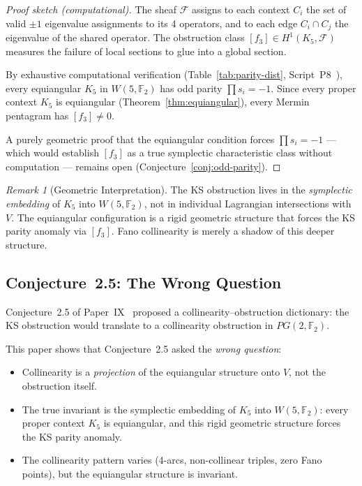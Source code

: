 \documentclass[11pt,a4paper]{article}
\theoremstyle{remark}
\newtheorem{remark}[theorem]{Remark}
\newcommand{\F}{\mathbb{F}}
\newcommand{\cF}{\mathcal{F}}
\begin{document}
\begin{proof}[Proof sketch (computational)]
The sheaf $\cF$ assigns to each context $C_i$ the set of valid
$\pm 1$ eigenvalue assignments to its 4 operators, and to each edge
$C_i \cap C_j$ the eigenvalue of the shared operator. The obstruction
class $[f_3] \in H^1(K_5, \cF)$ measures the failure of local sections
to glue into a global section.

By exhaustive computational verification
(Table~\ref{tab:parity-dist}, Script~P8~\cite{PaperXsuppl}), every equiangular $K_5$
in $W(5, \F_2)$ has odd parity $\prod s_i = -1$. Since every proper
context $K_5$ is equiangular (Theorem~\ref{thm:equiangular}), every
Mermin pentagram has $[f_3] \neq 0$.

A purely geometric proof that the equiangular condition forces
$\prod s_i = -1$ --- which would establish $[f_3]$ as a true
symplectic characteristic class without computation --- remains open
(Conjecture~\ref{conj:odd-parity}).
\end{proof}

\begin{remark}[Geometric Interpretation]
The KS obstruction lives in the \emph{symplectic embedding} of $K_5$
into $W(5, \F_2)$, not in individual Lagrangian intersections with $V$.
The equiangular configuration is a rigid geometric structure that forces
the KS parity anomaly via $[f_3]$. Fano collinearity is merely a shadow
of this deeper structure.
\end{remark}

\subsection{Conjecture~2.5: The Wrong Question}

Conjecture~2.5 of Paper~IX~\cite{PaperIX} proposed a collinearity--obstruction
dictionary: the KS obstruction would translate to a collinearity
obstruction in $PG(2, \F_2)$.

This paper shows that Conjecture~2.5 asked the \emph{wrong question}:

\begin{itemize}
  \item Collinearity is a \emph{projection} of the equiangular structure
    onto $V$, not the obstruction itself.
  \item The true invariant is the symplectic embedding of $K_5$ into
    $W(5, \F_2)$: every proper context $K_5$ is equiangular, and this
    rigid geometric structure forces the KS parity anomaly.
  \item The collinearity pattern varies (4-arcs, non-collinear triples,
    zero Fano points), but the equiangular structure is invariant.
\end{itemize}
\end{document}
